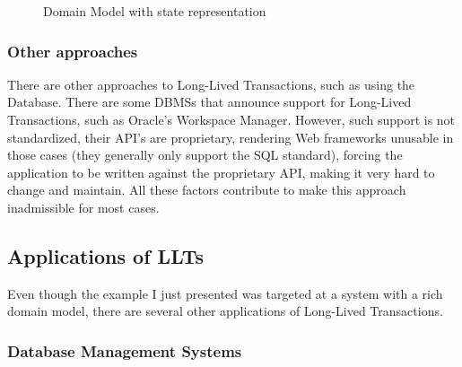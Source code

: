 \documentclass{llncs}
\begin{document}
\begin{figure}
  \centering

\caption{Domain Model with state representation}
\label{fig:courseDomainState}

\end{figure}

\subsubsection{Other approaches}

There are other approaches to Long-Lived Transactions, such as using
the Database. There are some DBMSs that announce support for
Long-Lived Transactions, such as Oracle's Workspace Manager. However,
such support is not standardized, their API's are proprietary,
rendering Web frameworks unusable in those cases (they generally only
support the SQL standard), forcing the application to be written
against the proprietary API, making it very hard to change and
maintain. All these factors contribute to make this approach
inadmissible for most cases.

\subsection{Applications of LLTs}

Even though the example I just presented was targeted at a system with
a rich domain model, there are several other applications of
Long-Lived Transactions.

\subsubsection{Database Management Systems}
\end{document}
